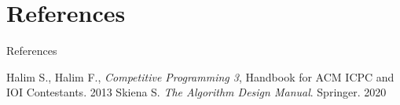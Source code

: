 \documentclass{beamer}
\begin{document}
\section*{References}
\begin{frame}{References}
    \begin{thebibliography}{}
         Halim S., Halim F., \textit{Competitive Programming 3}, Handbook for ACM ICPC and IOI Contestants. 2013
         Skiena S. \textit{The Algorithm Design Manual}. Springer. 2020
    \end{thebibliography}
\end{frame}
\end{document}
